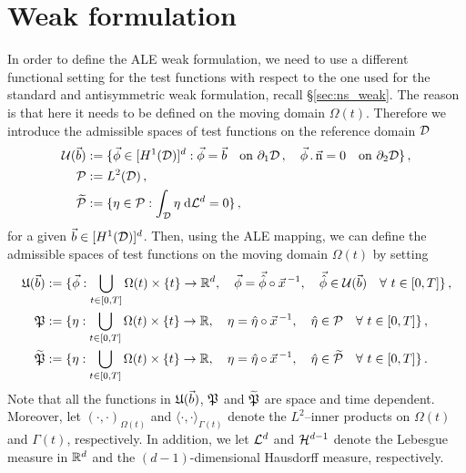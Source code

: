 \section{Weak formulation}\label{sec:ale_weak}
In order to define the ALE weak formulation, we need to use a different
functional setting for the test functions with respect to the one used for the
standard and antisymmetric weak formulation, recall \S\ref{sec:ns_weak}.
The reason is that here it
needs to be defined on the moving domain $\Omega(t)$. Therefore we introduce
the admissible spaces of test functions on the reference domain $\mathcal D$
\begin{align*}
\mathcal{U}(\vec{b}) &:= \{\vec \phi\in[H^1(\mathcal D)]^d:
\vec \phi =\vec b\quad \mbox{on }\partial_1\mathcal D\,,
\quad \vec \phi\,.\,\vec{\rm n}=0 \quad \mbox{on }\partial_2\mathcal D\}\,,\\
\mathcal{P} &:= L^2(\mathcal D)\,,\\
\widetilde{\mathcal{P}} &:= \{\eta\in\mathcal{P} : \int_\mathcal D\eta\;{\rm d}{\cal L}^{d}=0 \}\,,
\end{align*}
for a given $\vec b \in [H^1(\mathcal D)]^d$. Then, using the ALE mapping, we can
define the admissible spaces of test functions on the moving domain $\Omega(t)$
by setting
\begin{align*}
\uspaceale b &:= \{ \vec\phi:
\bigcup_{t \in [0,T]} \Omega(t)\times \{t\} \to \R^d,\quad
\vec \phi=\vec{\hat\phi}\circ\vec x^{\,-1},\quad\vec{\hat\phi}
\in\uspaceref b\quad \forall\ t \in [0,T]\}\,,\\
\pspaceale &:= \{ \eta:
\bigcup_{t \in [0,T]} \Omega(t)\times \{t\} \to \R,\quad
\eta=\hat\eta\circ\vec x^{\,-1},\quad\hat\eta\in\pspaceref
\quad \forall\ t \in [0,T]\}\,,\\
\pnormspaceale &:= \{ \eta:
\bigcup_{t \in [0,T]} \Omega(t)\times \{t\} \to \R,\quad \eta=
\hat\eta\circ\vec x^{\,-1},\quad \hat\eta\in\pnormspaceref\quad \forall\ t \in
[0,T] \}\,.
\end{align*}
Note that all the functions in $\mathfrak{U}(\vec{b})$, $\mathfrak{P}$ and
$\widetilde{\mathfrak{P}}$ are space and time dependent. Moreover, let
$(\cdot,\cdot)_{\Omega(t)}$ and $\langle \cdot, \cdot
\rangle_{\Gamma(t)}$ denote the $L^2$--inner products on $\Omega(t)$ and
$\Gamma(t)$, respectively. In addition, we let $\mathcal{L}^d$ and $\mathcal{H}^{d-1}$ denote the
Lebesgue measure in $\mathbb R^d$ and the $(d-1)$-dimensional Hausdorff measure,
respectively.

